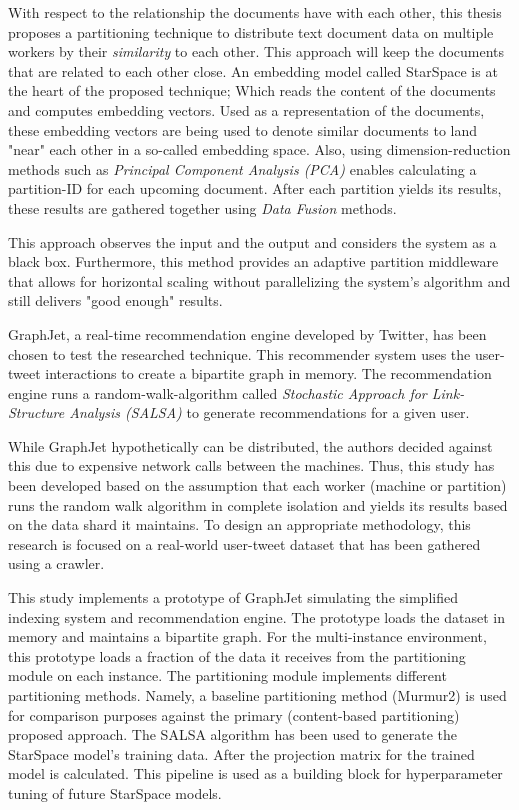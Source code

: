 With respect to the relationship the documents have with each other, this thesis proposes a partitioning technique to distribute text document data on multiple workers by their \emph{similarity} to each other. This approach will keep the documents that are related to each other close. An embedding model called StarSpace is at the heart of the proposed technique; Which reads the content of the documents and computes embedding vectors. Used as a representation of the documents, these embedding vectors are being used to denote similar documents to land "near" each other in a so-called embedding space. Also, using dimension-reduction methods such as \emph{Principal Component Analysis (PCA)} enables calculating a partition-ID for each upcoming document. After each partition yields its results, these results are gathered together using \emph{Data Fusion} methods. 


This approach observes the input and the output and considers the system as a black box. Furthermore, this method provides an adaptive partition middleware that allows for horizontal scaling without parallelizing the system's algorithm and still delivers "good enough" results.


GraphJet, a real-time recommendation engine developed by Twitter, has been chosen to test the researched technique. This recommender system uses the user-tweet interactions to create a bipartite graph in memory. The recommendation engine runs a random-walk-algorithm called \emph{Stochastic Approach for Link-Structure Analysis (SALSA)} to generate recommendations for a given user. 


While GraphJet hypothetically can be distributed, the authors decided against this due to expensive network calls between the machines. Thus, this study has been developed based on the assumption that each worker (machine or partition) runs the random walk algorithm in complete isolation and yields its results based on the data shard it maintains. To design an appropriate methodology, this research is focused on a real-world user-tweet dataset that has been gathered using a crawler. 


This study implements a prototype of GraphJet simulating the simplified indexing system and recommendation engine. The prototype loads the dataset in memory and maintains a bipartite graph. For the multi-instance environment, this prototype loads a fraction of the data it receives from the partitioning module on each instance. The partitioning module implements different partitioning methods. Namely, a baseline partitioning method (Murmur2) is used for comparison purposes against the primary (content-based partitioning) proposed approach. The SALSA algorithm has been used to generate the StarSpace model's training data. After the projection matrix for the trained model is calculated. This pipeline is used as a building block for hyperparameter tuning of future StarSpace models.


